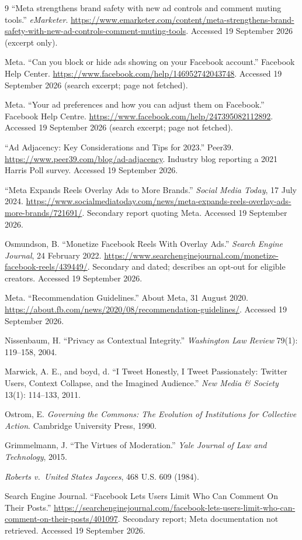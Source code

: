 \documentclass[11pt]{article}
\theoremstyle{definition}
\theoremstyle{remark}
\begin{document}
{\begin{thebibliography}{9}
 ``Meta strengthens brand safety with new ad controls and comment muting tools.'' \emph{eMarketer}. \url{https://www.emarketer.com/content/meta-strengthens-brand-safety-with-new-ad-controls-comment-muting-tools}. Accessed 19 September 2026 (excerpt only).

 Meta. ``Can you block or hide ads showing on your Facebook account.'' Facebook Help Center. \url{https://www.facebook.com/help/146952742043748}. Accessed 19 September 2026 (search excerpt; page not fetched).

 Meta. ``Your ad preferences and how you can adjust them on Facebook.'' Facebook Help Centre. \url{https://www.facebook.com/help/247395082112892}. Accessed 19 September 2026 (search excerpt; page not fetched).

 ``Ad Adjacency: Key Considerations and Tips for 2023.'' Peer39. \url{https://www.peer39.com/blog/ad-adjacency}. Industry blog reporting a 2021 Harris Poll survey. Accessed 19 September 2026.

 ``Meta Expands Reels Overlay Ads to More Brands.'' \emph{Social Media Today}, 17 July 2024. \url{https://www.socialmediatoday.com/news/meta-expands-reels-overlay-ads-more-brands/721691/}. Secondary report quoting Meta. Accessed 19 September 2026.

 Osmundson, B. ``Monetize Facebook Reels With Overlay Ads.'' \emph{Search Engine Journal}, 24 February 2022. \url{https://www.searchenginejournal.com/monetize-facebook-reels/439449/}. Secondary and dated; describes an opt-out for eligible creators. Accessed 19 September 2026.

 Meta. ``Recommendation Guidelines.'' About Meta, 31 August 2020. \url{https://about.fb.com/news/2020/08/recommendation-guidelines/}. Accessed 19 September 2026.

 Nissenbaum, H. ``Privacy as Contextual Integrity.'' \emph{Washington Law Review} 79(1): 119--158, 2004.

 Marwick, A. E., and boyd, d. ``I Tweet Honestly, I Tweet Passionately: Twitter Users, Context Collapse, and the Imagined Audience.'' \emph{New Media \& Society} 13(1): 114--133, 2011.

 Ostrom, E. \emph{Governing the Commons: The Evolution of Institutions for Collective Action}. Cambridge University Press, 1990.

 Grimmelmann, J. ``The Virtues of Moderation.'' \emph{Yale Journal of Law and Technology}, 2015.

 \emph{Roberts v.\ United States Jaycees}, 468 U.S. 609 (1984).

 Search Engine Journal. ``Facebook Lets Users Limit Who Can Comment On Their Posts.'' \url{https://searchenginejournal.com/facebook-lets-users-limit-who-can-comment-on-their-posts/401097}. Secondary report; Meta documentation not retrieved. Accessed 19 September 2026.
\end{thebibliography}
}
\end{document}
